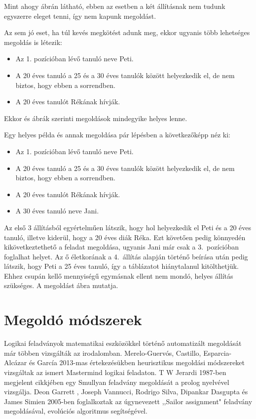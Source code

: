 \documentclass[12pt,a4paper,oneside]{report}
\begin{document}
Mint ahogy  ábrán látható, ebben az esetben a két állításnak nem tudunk egyszerre eleget tenni, így nem kapunk megoldást.


Az sem jó eset, ha túl kevés megkötést adunk meg, ekkor ugyanis több lehetséges megoldás is létezik:
\begin{itemize}
\item Az 1. pozícióban lévő tanuló neve Peti.
\item A 20 éves tanuló a 25 és a 30 éves tanulók között helyezkedik el, de nem biztos, hogy ebben a sorrendben.
\item A 20 éves tanulót Rékának hívják.
\end{itemize}

Ekkor   és  ábrák szerinti megoldások mindegyike helyes lenne.




Egy helyes példa és annak megoldása pár lépésben a következőképp néz ki:
\begin{itemize}
\item Az 1. pozícióban lévő tanuló neve Peti.
\item A 20 éves tanuló a 25 és a 30 éves tanulók között helyezkedik el, de nem biztos, hogy ebben a sorrendben.
\item A 20 éves tanulót Rékának hívják.
\item A 30 éves tanuló neve Jani.
\end{itemize}

Az első 3 állításból egyértelműen látszik, hogy hol helyezkedik el Peti és a 20 éves tanuló, illetve kiderül, hogy a 20 éves diák Réka. 
Ezt követően pedig könnyedén kikövetkeztethető a feladat megoldása, ugyanis Jani már csak a 3.\ pozícióban foglalhat helyet. 
Az ő életkorának a 4.\ állítás alapján történő beírása után pedig látszik, hogy Peti a 25 éves tanuló, így a táblázatot hiánytalanul kitölthetjük.
Ehhez csupán kellő mennyiségű egymásnak ellent nem mondó, helyes állítás szükséges. 
A megoldást  ábra mutatja.

    \section{Megoldó módszerek} %
Logikai feladványok matematikai eszközökkel történő automatizált megoldását már többen vizsgálták az irodalomban. Merelo-Guervós, Castillo, Esparcia-Alcázar és García 2013-mas értekezésükben heurisztikus megoldási módszereket vizsgáltak az ismert Mastermind logikai feladaton\cite{Merelo-Guervos:2013:IES:2463372.2463473}.
T W Jerardi	1987-ben megjelent cikkjében egy Smullyan feladvány megoldását a prolog nyelvével vizsgálja\cite{Jerardi:1987:PPL:24714.24722}.
Deon Garrett	, Joseph Vannucci, Rodrigo Silva, Dipankar Dasgupta és James Simien 2005-ben foglalkoztak az úgynevezett ,,Sailor assignment" feladvány megoldásával, evolúciós algoritmus segítségével\cite{Garrett:2005:GAS:1068009.1068333}.
\end{document}
